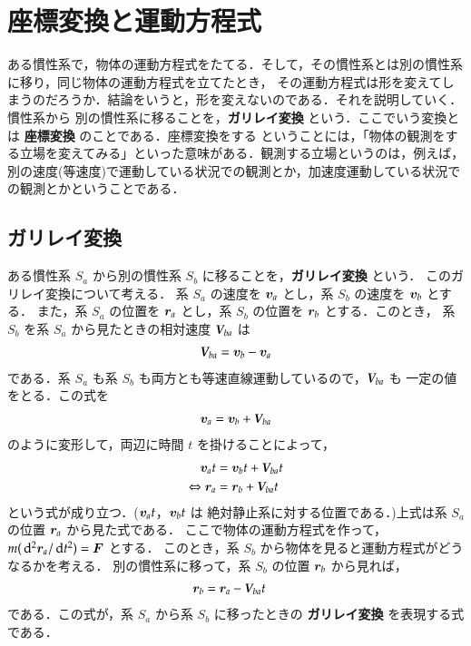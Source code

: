 \section{座標変換と運動方程式}

            \begin{mycomment}
            ある慣性系で，物体の運動方程式をたてる．そして，その慣性系とは別の慣性系に移り，同じ物体の運動方程式を立てたとき，
            その運動方程式は形を変えてしまうのだろうか．結論をいうと，形を変えないのである．それを説明していく．慣性系から
            別の慣性系に移ることを，\textbf{ガリレイ変換} という．ここでいう変換とは \textbf{座標変換} のことである．座標変換をする
            ということには，「物体の観測をする立場を変えてみる」といった意味がある．観測する立場というのは，例えば，
            別の速度(等速度)で運動している状況での観測とか，加速度運動している状況での観測とかということである．
            \end{mycomment}

\subsection{ガリレイ変換}
            ある慣性系 $S_{a}$ から別の慣性系 $S_{b}$ に移ることを，\textbf{ガリレイ変換} という．
            このガリレイ変換について考える．
            系 $S_{a}$ の速度を
            $\boldsymbol{v}_{a}$ とし，系 $S_{b}$ の速度を $\boldsymbol{v}_{b}$ とする．
            また，系 $S_{a}$ の位置を
            $\boldsymbol{r}_{a}$ とし，系 $S_{b}$ の位置を $\boldsymbol{r}_{b}$ とする．このとき，
            系 $S_{b}$ を系 $S_{a}$ から見たときの相対速度 $\textit{\textbf{V}}_{ba}$ は
                \begin{align}
                    \textit{\textbf{V}}_{ba}=\boldsymbol{v}_{b}-\boldsymbol{v}_{a}
                \end{align}
            である．系 $S_{a}$ も系 $S_{b}$ も両方とも等速直線運動しているので，$\textit{\textbf{V}}_{ba}$ も
            一定の値をとる．この式を
                \begin{align}
                    \boldsymbol{v}_{a}=\boldsymbol{v}_{b}+\textit{\textbf{V}}_{ba}
                \end{align}
            のように変形して，両辺に時間 $t$ を掛けることによって，
                \begin{align}
                    \boldsymbol{v}_{a}t&=\boldsymbol{v}_{b}t+\textit{\textbf{V}}_{ba}t \notag \\
                    \Leftrightarrow\boldsymbol{r}_{a}&=\boldsymbol{r}_{b}+\textit{\textbf{V}}_{ba}t
                \end{align}
            という式が成り立つ．($\boldsymbol{v}_{a}t$，$\boldsymbol{v}_{b}t$ は
            絶対静止系に対する位置である．)上式は系 $S_{a}$ の位置 $\boldsymbol{r}_{a}$ から見た式である．
            ここで物体の運動方程式を作って，$m(\,\mathrm{d}^{2}\boldsymbol{r}_{a}/\,\mathrm{d} t^{2})=\boldsymbol{F}$ とする．
            このとき，系 $S_{b}$ から物体を見ると運動方程式がどうなるかを考える．
            別の慣性系に移って，系 $S_{b}$ の位置 $\boldsymbol{r}_{b}$ から見れば，
                \begin{align}
                    \boldsymbol{r}_{b}&=\boldsymbol{r}_{a}-\textit{\textbf{V}}_{ba}t
                \end{align}
            である．この式が，系 $S_{a}$ から系 $S_{b}$ に移ったときの \textbf{ガリレイ変換} を表現する式である．

